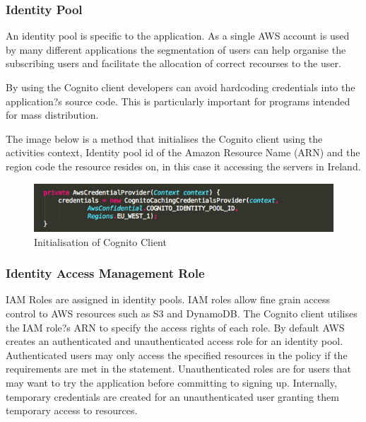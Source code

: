 \documentclass[a4paper, 11pt]{article}
\begin{document}
\subsubsection{Identity Pool}
An identity pool is specific to the application. As a single AWS account is used by many different applications the segmentation of users can help organise the subscribing users and facilitate the allocation of correct recourses to the user. 

By using the Cognito client developers can avoid hardcoding credentials into the application?s source code. This is particularly important for programs intended for mass distribution. 

The image below is a method that initialises the Cognito client using the activities context, Identity pool id of the Amazon Resource Name (ARN) and the region code the resource resides on, in this case it accessing the servers in Ireland.  

\begin{figure}[h]
\centering
\includegraphics[width=\textwidth]{cognito_client_code.png}
\caption{Initialisation of Cognito Client}
\end{figure}

\subsubsection{Identity Access Management Role}
IAM Roles are assigned in identity pools. IAM roles allow fine grain access control to AWS resources such as S3 and DynamoDB. The Cognito client utilises the IAM role?s ARN to specify the access rights of each role. By default AWS creates an authenticated and unauthenticated access role for an identity pool. Authenticated users may only access the specified resources in the policy if the requirements are met in the statement. Unauthenticated roles are for users that may want to try the application before committing to signing up. Internally, temporary credentials are created for an unauthenticated user granting them temporary access to resources. 
\end{document}
